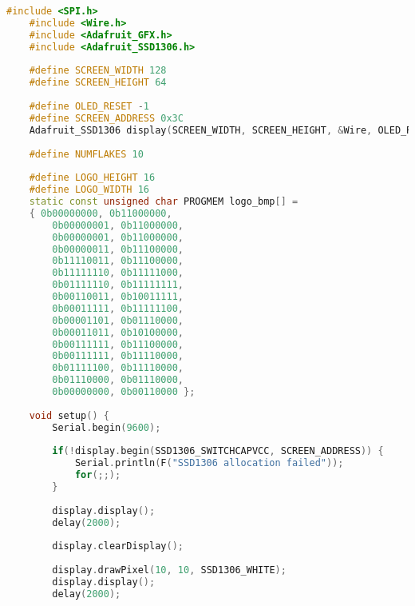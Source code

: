 \begin{code} [H]
	\begin{lstlisting}[language=c++]
	#include <SPI.h>
	#include <Wire.h>
	#include <Adafruit_GFX.h>
	#include <Adafruit_SSD1306.h>
	
	#define SCREEN_WIDTH 128
	#define SCREEN_HEIGHT 64
	
	#define OLED_RESET -1
	#define SCREEN_ADDRESS 0x3C
	Adafruit_SSD1306 display(SCREEN_WIDTH, SCREEN_HEIGHT, &Wire, OLED_RESET);
	
	#define NUMFLAKES 10
	
	#define LOGO_HEIGHT 16
	#define LOGO_WIDTH 16
	static const unsigned char PROGMEM logo_bmp[] =
	{ 0b00000000, 0b11000000,
		0b00000001, 0b11000000,
		0b00000001, 0b11000000,
		0b00000011, 0b11100000,
		0b11110011, 0b11100000,
		0b11111110, 0b11111000,
		0b01111110, 0b11111111,
		0b00110011, 0b10011111,
		0b00011111, 0b11111100,
		0b00001101, 0b01110000,
		0b00011011, 0b10100000,
		0b00111111, 0b11100000,
		0b00111111, 0b11110000,
		0b01111100, 0b11110000,
		0b01110000, 0b01110000,
		0b00000000, 0b00110000 };
	
	void setup() {
		Serial.begin(9600);
		
		if(!display.begin(SSD1306_SWITCHCAPVCC, SCREEN_ADDRESS)) {
			Serial.println(F("SSD1306 allocation failed"));
			for(;;);
		}
		
		display.display();
		delay(2000);
		
		display.clearDisplay();
		
		display.drawPixel(10, 10, SSD1306_WHITE);
		display.display();
		delay(2000);
		
\end{lstlisting} 
\end{code}

